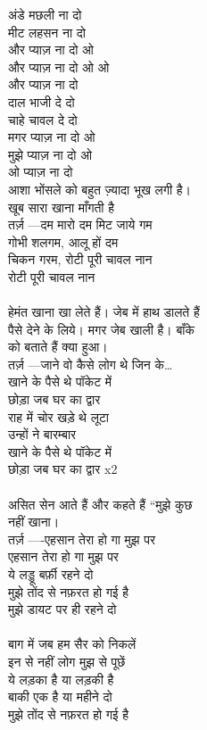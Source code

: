 {{अंडे मछली ना दो\\
मीट लहसन ना दो\\
और प्याज़ ना दो ओ\\
और प्याज़ ना दो ओ ओ\\
और प्याज़ ना दो\\
दाल भाजी दे दो\\
चाहे चावल दे दो\\
मगर प्याज़ ना दो ओ\\
मुझे प्याज़ ना दो ओ\\
ओ प्याज़ ना दो\\
आशा भोंसले को बहुत ज़्यादा भूख लगी है।\\
खूब सारा खाना माँगती है\\
तर्ज़ —दम मारो दम मिट जाये गम\\
गोभी शलगम, आलू हों दम\\
चिकन गरम, रोटी पूरी चावल नान\\
रोटी पूरी चावल नान\\
\\
हेमंत खाना खा लेते हैं। जेब में हाथ डालते हैं\\
पैसे देने के लिये। मगर जेब खाली है। बाँके\\
को बताते हैं क्या हुआ।\\
तर्ज़ —जाने वो कैसे लोग थे जिन के…\\
खाने के पैसे थे पॉकेट में\\
छोड़ा जब घर का द्वार\\
राह में चोर खड़े थे लूटा\\
उन्हों ने बारम्बार\\
खाने के पैसे थे पॉकेट में\\
छोड़ा जब घर का द्वार x2\\
\\
असित सेन आते हैं और कहते हैं “मुझे कुछ\\
नहीं खाना।\\
तर्ज़ —-एहसान तेरा हो गा मुझ पर\\
एहसान तेरा हो गा मुझ पर\\
ये लड्डू बर्फ़ी रहने दो\\
मुझे तोंद से नफ़रत हो गई है\\
मुझे डायट पर ही रहने दो\\
\\
बाग में जब हम सैर को निकलें\\
इन से नहीं लोग मुझ से पूछें\\
ये लड़का है या लड़की है\\
बाकी एक है या महीने दो\\
मुझे तोंद से नफ़रत हो गई है\\
}}
